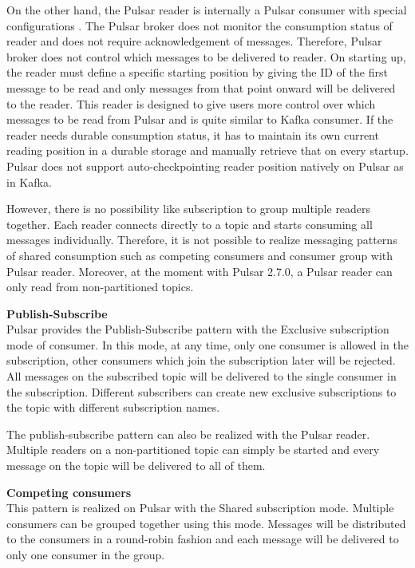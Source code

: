 On the other hand, the Pulsar reader is internally a Pulsar consumer with special configurations \cite{pulsarconceptclients}. The Pulsar broker does not monitor the consumption status of reader and does not require acknowledgement of messages. Therefore, Pulsar broker does not control which messages to be delivered to reader. On starting up, the reader must define a specific starting position by giving the ID of the first message to be read and only messages from that point onward will be delivered to the reader. This reader is designed to give users more control over which messages to be read from Pulsar and is quite similar to Kafka consumer. If the reader needs durable consumption status, it has to maintain its own current reading position in a durable storage and manually retrieve that on every startup. Pulsar does not support auto-checkpointing reader position natively on Pulsar as in Kafka. 

However, there is no possibility like subscription to group multiple readers together. Each reader connects directly to a topic and starts consuming all messages individually. Therefore, it is not possible to realize messaging patterns of shared consumption such as competing consumers and consumer group with Pulsar reader. Moreover, at the moment with Pulsar 2.7.0, a Pulsar reader can only read from non-partitioned topics.

\textbf{Publish-Subscribe}\\
Pulsar provides the Publish-Subscribe pattern with the Exclusive subscription mode of consumer. In this mode, at any time, only one consumer is allowed in the subscription, other consumers which join the subscription later will be rejected. All messages on the subscribed topic will be delivered to the single consumer in the subscription. Different subscribers can create new exclusive subscriptions to the topic with different subscription names.

The publish-subscribe pattern can also be realized with the Pulsar reader. Multiple readers on a non-partitioned topic can simply be started and every message on the topic will be delivered to all of them. 

\textbf{Competing consumers}\\
This pattern is realized on Pulsar with the Shared subscription mode. Multiple consumers can be grouped together using this mode. Messages will be distributed to the consumers in a round-robin fashion and each message will be delivered to only one consumer in the group.


